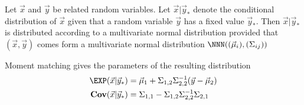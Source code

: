 \documentclass[landscape,footrule]{foils}
\newcommand{\COV}{\mathbf{Cov}}
\begin{document}
Let $\vec{x}$ and $\vec{y}$ be related random variables. 
Let $\vec{x}|\vec{y}_*$ denote the conditional distribution of $\vec{x}$ given that a random variable $\vec{y}$ has a fixed value $\vec{y}_*$.
Then $\vec{x}|\vec{y}_*$ is distributed according to a multivariate normal distribution provided that 
 $(\vec{x},\vec{y})$ comes form a multivariate normal distribution $\NNN((\vec{\mu}_i),(\Sigma_{ij}))$

\begin{triangles}
\item Moment matching gives the parameters of the resulting distribution 
\begin{align*}
\EXP(\vec{x}|\vec{y}_*)&= \vec{\mu}_1+ \Sigma_{1,2}\Sigma_{2,2}^{-1}(\vec{y}-\vec{\mu}_2)\\
\COV(\vec{x}|\vec{y}_*)&= \Sigma_{1,1}-\Sigma_{1,2}\Sigma_{2,2}^{-1}\Sigma_{2,1}\\
\end{align*}
\end{triangles}



\end{document}

